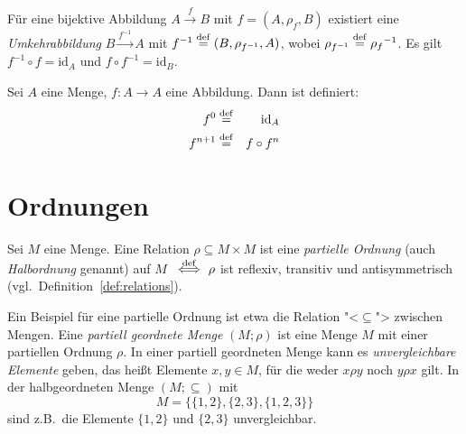 \begin{lemma} Für eine bijektive Abbildung $A \stackrel{f}{\longrightarrow} B$
   mit $f =(A, \rho_f,B)$ existiert eine \emph{Umkehrabbildung}
   $B \stackrel{f^{-1}}{\longrightarrow} A$ mit $f^{-1} \stackrel{\rm def}{=} (B,\rho_{f^{-1}},A)$,
   wobei $\rho_{f^{-1}} \stackrel{\rm def}{=} {\rho_f}^{-1}$. Es gilt $f^{-1} \circ f = \textrm{id}_A$
   und $f \circ f^{-1} = \textrm{id}_B$.
\end{lemma}

\begin{definition}
  \label{def:power_fun}
  Sei $A$ eine Menge, 
  $f:A\rightarrow A$ eine Abbildung.  Dann ist definiert:
  \begin{eqnarray*}
    f^0 &\stackrel{\rm def}{=}& \textrm{id}_A\\
    f^{n+1} &\stackrel{\rm def}{=}& f\circ f^n
  \end{eqnarray*}
\end{definition}

\section{Ordnungen}
\label{sec:halbordnungen}

\begin{definition}
   Sei $M$ eine Menge. Eine Relation $\rho \subseteq M \times M$ ist eine
   \textit{partielle Ordnung}
   (auch
   \textit{Halb\-ord\-nung} genannt)
 auf $M$ \ $\stackrel{\rm def}{\Longleftrightarrow} \ \rho$ ist
   reflexiv, transitiv und antisymmetrisch (vgl.\ Definition~\ref{def:relations}).
\end{definition}

Ein Beispiel für eine partielle Ordnung ist etwa die Relation "<$\subseteq$"> zwischen 
Mengen. Eine \emph{partiell geordnete Menge} $(M;\rho)$ 
ist eine Menge $M$ mit einer
partiellen Ordnung $\rho$. In einer 
partiell ge\-ord\-ne\-ten Menge kann es
\emph{unvergleichbare Elemente} geben, das heißt Elemente $x,y \in M$, für die weder
$x \rho y$ noch $y \rho x$ gilt. In der halbgeordneten Menge $(M;\subseteq)$ mit
\[ M = \{\{1,2\},\{2,3\},\{1,2,3\}\} \]
sind z.B.\ die Elemente $\{1,2\}$ und $\{2,3\}$ unvergleichbar. 


